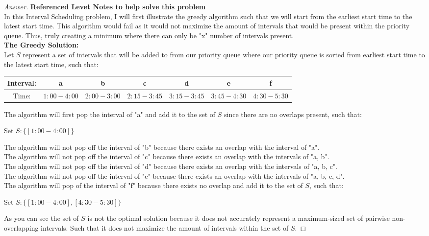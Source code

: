 \documentclass[11pt]{article}
\theoremstyle{definition}
\theoremstyle{definition}
\theoremstyle{definition}
\begin{document}
\begin{proof}[Answer] \textbf{Referenced Levet Notes to help solve this problem} \\
In this Interval Scheduling problem, I will first illustrate the greedy algorithm such that we will start from the earliest start time to the latest start time. This algorithm would fail as it would not maximize the amount of intervals that would be present within the priority queue. Thus, truly creating a minimum where there can only be "x" number of intervals present. \\

\textbf {The Greedy Solution:}\\
Let $S$ represent a set of intervals that will be added to from our priority queue where our priority queue is sorted from earliest start time to the latest start time, such that: \\
\begin{center}
\begin{tabular}{ | c | c | c | c | c | c | c | }
 \hline
 Interval:& a & b & c & d & e & f\\  
 \hline
 Time: & $1:00 - 4:00$ & $2:00 - 3:00$ & $2:15 - 3:45$ & $3:15 - 3:45$ & $3:45 - 4:30$ & $4:30 - 5:30$\\
  \hline
\end{tabular}
\end{center}
The algorithm will first pop the interval of "a" and add it to the set of $S$ since there are no overlaps present, such that: \\
\begin{center}
Set $S: \{[1:00 - 4: 00]\}$\\
\end{center}

The algorithm will not pop off the interval of "b" because there exists an overlap with the interval of "a". \\
The algorithm will not pop off the interval of "c" because there exists an overlap with the intervals of "a, b". \\
The algorithm will not pop off the interval of "d" because there exists an overlap with the intervals of "a, b, c". \\
The algorithm will not pop off the interval of "e" because there exists an overlap with the intervals of "a, b, c, d". \\

The algorithm will pop of the interval of "f" because there exists no overlap and add it to the set of $S$, such that: \\
\begin{center}
Set $S: \{[1:00 - 4: 00], [4:30 - 5:30]\}$\\
\end{center}
As you can see the set of $S$ is not the optimal solution because it does not accurately represent a maximum-sized set of pairwise non-overlapping intervals. Such that it does not maximize the amount of intervals within the set of $S$.
\end{proof}
\end{document}
